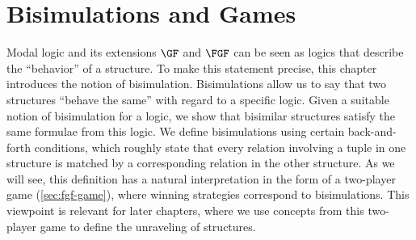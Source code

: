 \chapter{Bisimulations and Games}
Modal logic and its extensions $\GF$ and $\FGF$ can be seen as logics that describe the ``behavior'' of a structure.
To make this statement precise, this chapter introduces the notion of bisimulation.
Bisimulations allow us to say that two structures ``behave the same'' with regard to a specific logic.
Given a suitable notion of bisimulation for a logic, we show that bisimilar structures satisfy the same formulae from this logic.
We define bisimulations using certain back-and-forth conditions, which roughly state that every relation involving a tuple in one structure is matched by a corresponding relation in the other structure.
As we will see, this definition has a natural interpretation in the form of a two-player game (\cref{sec:fgf-game}), where winning strategies correspond to bisimulations.
This viewpoint is relevant for later chapters, where we use concepts from this two-player game to define the unraveling of structures.

